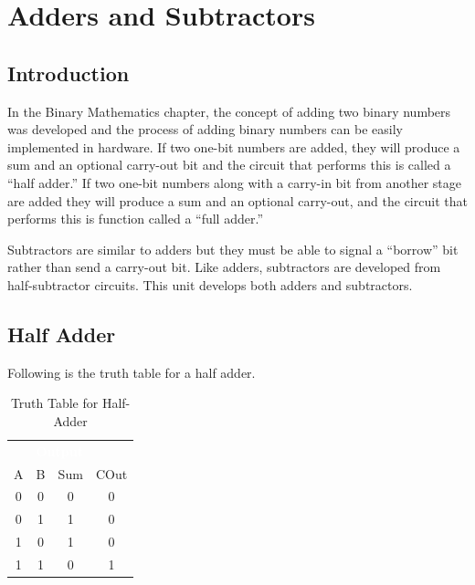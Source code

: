 \section{Adders and Subtractors}
\label{CL:sec:adders_and_subtractors}

\subsection{Introduction}
\label{CL:subsec:introduction_to_adders_and_subtractors}

In the Binary Mathematics chapter, the concept of adding two binary numbers was developed and the process of adding binary numbers can be easily implemented in hardware. If two one-bit numbers are added, they will produce a sum and an optional carry-out bit and the circuit that performs this is called a ``half adder.'' If two one-bit numbers along with a carry-in bit from another stage are added they will produce a sum and an optional carry-out, and the circuit that performs this is function called a ``full adder.'' 

Subtractors are similar to adders but they must be able to signal a ``borrow'' bit rather than send a carry-out bit. Like adders, subtractors are developed from half-subtractor circuits. This unit develops both adders and subtractors.

\subsection{Half Adder}
\label{CL:subsec:half_adder}

Following is the truth table for a half adder.

\begin{table}[H]
  \sffamily
  \newcommand{\head}[1]{\textcolor{white}{\textbf{#1}}}    
  \begin{center}
    \begin{tabular}{cc|cc} 
      \rowcolor{black!75}
      \multicolumn{2}{c}{\head{Inputs}} & \multicolumn{2}{c}{\head{Output}} \\
      A & B & Sum & COut \\
      \hline
      0 & 0 & 0 & 0 \\
      0 & 1 & 1 & 0 \\
      1 & 0 & 1 & 0 \\
      1 & 1 & 0 & 1 
    \end{tabular}
  \end{center}
  \caption{Truth Table for Half-Adder}
  \label{CL:tab:truth_table_for_half_adder}
\end{table}

